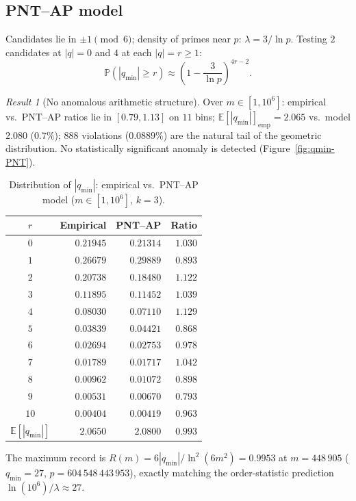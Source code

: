 \documentclass[11pt,a4paper]{article}
\theoremstyle{definition}
\theoremstyle{remark}
\newtheorem{result}[theorem]{Result}
\newcommand{\Prob}{\mathbb{P}}
\newcommand{\E}{\mathbb{E}}
\newcommand{\qmin}{q_{\min}}
\begin{document}
\subsection{PNT--AP model}

Candidates lie in $\pm 1\pmod 6$; density of primes near $p$:
$\lambda=3/\ln p$. Testing $2$ candidates at $|q|=0$ and $4$ at each
$|q|=r\ge 1$:
\[
  \Prob(|\qmin|\ge r)\approx\left(1-\frac{3}{\ln p}\right)^{4r-2}.
\]

\begin{negativebox}
\begin{result}[No anomalous arithmetic structure]\label{res:no-anomaly}
Over $m\in[1,10^{6}]$: empirical vs.\ PNT--AP ratios lie in
$[0.79,1.13]$ on $11$ bins; $\E[|\qmin|]_{\text{emp}}=2.065$ vs.\
model $2.080$ ($0.7\%$); $888$ violations ($0.0889\%$) are the
natural tail of the geometric distribution. No statistically
significant anomaly is detected (Figure~\ref{fig:qmin-PNT}).
\end{result}
\end{negativebox}

\begin{table}[ht]\centering
\caption{Distribution of $|\qmin|$: empirical vs.\ PNT--AP model
($m\in[1,10^{6}]$, $k=3$).}
\begin{tabular}{@{}crrr@{}}
\toprule
$r$ & Empirical & PNT--AP & Ratio \\
\midrule
$0$ & $0.21945$ & $0.21314$ & $1.030$ \\
$1$ & $0.26679$ & $0.29889$ & $0.893$ \\
$2$ & $0.20738$ & $0.18480$ & $1.122$ \\
$3$ & $0.11895$ & $0.11452$ & $1.039$ \\
$4$ & $0.08030$ & $0.07110$ & $1.129$ \\
$5$ & $0.03839$ & $0.04421$ & $0.868$ \\
$6$ & $0.02694$ & $0.02753$ & $0.978$ \\
$7$ & $0.01789$ & $0.01717$ & $1.042$ \\
$8$ & $0.00962$ & $0.01072$ & $0.898$ \\
$9$ & $0.00531$ & $0.00670$ & $0.793$ \\
$10$ & $0.00404$ & $0.00419$ & $0.963$ \\
\midrule
$\E[|\qmin|]$ & $2.0650$ & $2.0800$ & $0.993$ \\
\bottomrule
\end{tabular}
\end{table}

The maximum record is
$R(m)=6|\qmin|/\ln^{2}(6m^{2})=0.9953$ at $m=448\,905$
($\qmin=27$, $p=604\,548\,443\,953$), exactly matching the
order-statistic prediction $\ln(10^{6})/\lambda\approx 27$.
\end{document}
